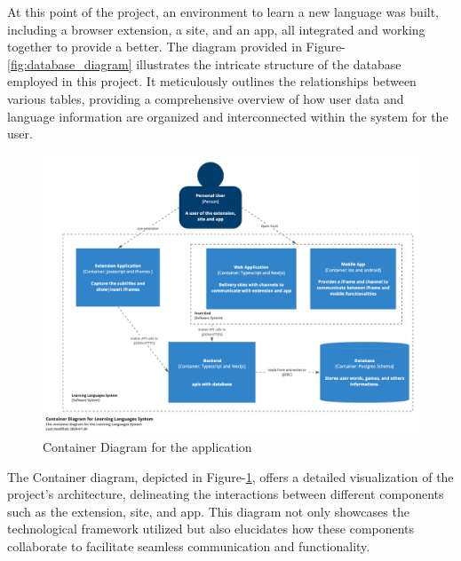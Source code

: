 \documentclass[12pt]{article}
\begin{document}
At this point of the project, an environment to learn a new language was built, including a browser extension, a site, and an app, all integrated and working together to provide a better. The diagram provided in Figure-\ref{fig:database_diagram} illustrates the intricate structure of the database employed in this project. It meticulously outlines the relationships between various tables, providing a comprehensive overview of how user data and language information are organized and interconnected within the system for the user. \\
\begin{figure}[h]
  \centering
  \caption{
    Container Diagram for the application
  }
  \label{fig:container_diagram}
  \includegraphics[width=1\textwidth]{assets/24.png}
\end{figure}
The Container diagram, depicted in Figure-\ref{fig:container_diagram}, offers a detailed visualization of the project's architecture, delineating the interactions between different components such as the extension, site, and app. This diagram not only showcases the technological framework utilized but also elucidates how these components collaborate to facilitate seamless communication and functionality. \\
\end{document}
